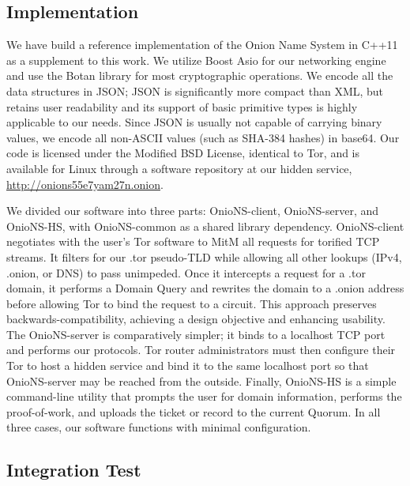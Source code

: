 \documentclass[USenglish,oneside,twocolumn]{article}
\begin{document}
\subsection{Implementation}

We have build a reference implementation of the Onion Name System in C++11 as a supplement to this work. We utilize Boost Asio \cite{AsioLib} for our networking engine and use the Botan \cite{BotanLib} library for most cryptographic operations. We encode all the data structures in JSON; JSON is significantly more compact than XML, but retains user readability and its support of basic primitive types is highly applicable to our needs. Since JSON is usually not capable of carrying binary values, we encode all non-ASCII values (such as SHA-384 hashes) in base64. Our code is licensed under the Modified BSD License, identical to Tor, and is available for Linux through a software repository at our hidden service, \href{http://onions55e7yam27n.onion}{http://onions55e7yam27n.onion}.

We divided our software into three parts: OnioNS-client, OnioNS-server, and OnioNS-HS, with OnioNS-common as a shared library dependency. OnioNS-client negotiates with the user's Tor software to MitM all requests for torified TCP streams. It filters for our .tor pseudo-TLD while allowing all other lookups (IPv4, .onion, or DNS) to pass unimpeded. Once it intercepts a request for a .tor domain, it performs a Domain Query and rewrites the domain to a .onion address before allowing Tor to bind the request to a circuit. This approach preserves backwards-compatibility, achieving a design objective and enhancing usability. The OnioNS-server is comparatively simpler; it binds to a localhost TCP port and performs our protocols. Tor router administrators must then configure their Tor to host a hidden service and bind it to the same localhost port so that OnioNS-server may be reached from the outside. Finally, OnioNS-HS is a simple command-line utility that prompts the user for domain information, performs the proof-of-work, and uploads the ticket or record to the current Quorum. In all three cases, our software functions with minimal configuration.

\subsection{Integration Test}
\end{document}
